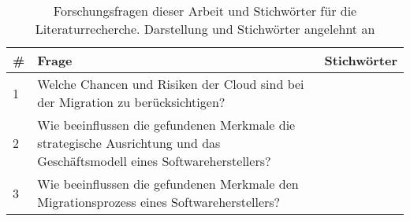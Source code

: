 %
%
\begin{table}[h]
\centering
\begin{tabular}{|l|p{}|p{}|}
	\hline
	\textbf{\#} & \textbf{Frage} & \textbf{Stichwörter} \\
	\hline
	1 & Welche Chancen und Risiken der Cloud sind bei der Migration zu 
berücksichtigen? & \\
	\hline
	2 & Wie beeinflussen die gefundenen Merkmale die strategische 
Ausrichtung und das Geschäftsmodell eines Softwareherstellers? & \\
	\hline
	3 & Wie beeinflussen die gefundenen Merkmale den Migrationsprozess 
eines Softwareherstellers? & \\

	\hline
\end{tabular}
\caption{Forschungsfragen dieser Arbeit und Stichwörter für die 
Literaturrecherche. Darstellung und Stichwörter angelehnt an 
\cite{exploring_the_factors}
}
\label{tab:forschungsfragen}
\end{table}

\begin{comment}
	1 & In welche Aufgaben lässt sich die Migration einer 
On-Premise-Software zu Salesforce unterteilen? & tasks, needs \\
	\hline
	2 & Welche Methoden unterstützen diesen 
Migrationsprozess? & methods, standards, framework \\
	\hline
	3 & Wie unterstützt Salesforce die Migration technisch? & tools, 
interfaces, api\\
	\hline
	4 & Wie wirkt sich die Migration auf die strategische Marktposition 
aus? & strategy, market\\
\end{comment}
